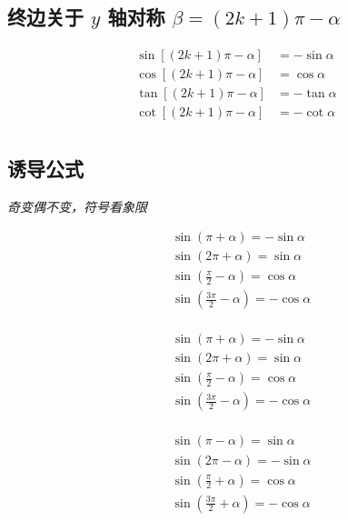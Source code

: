 \documentclass[a4paper, fleqn, fontset = mac]{ctexart}
\newcommand{\diform}{\noindent}
\begin{document}
\begin{multicols}{2}
		\subsection{终边关于 $ y $ 轴对称 $\beta=(2k+1)\pi-\alpha$}\diform
			\begin{align*}
			\sin\left[\left(2k+1\right)\pi-\alpha\right]&=-\sin\alpha \\
			\cos\left[\left(2k+1\right)\pi-\alpha\right]&=\cos\alpha \\
			\tan\left[\left(2k+1\right)\pi-\alpha\right]&=-\tan\alpha \\
			\cot\left[\left(2k+1\right)\pi-\alpha\right]&=-\cot\alpha \\
			\end{align*}
		\end{multicols}
		
		\subsection{诱导公式}
		\emph{奇变偶不变，符号看象限}
		
%			

		\begin{minipage}{0.3\textwidth}
			\begin{align*}
			& \sin\left( \pi + \alpha \right) = -\sin\alpha \\
			& \sin\left( 2\pi + \alpha \right) = \sin\alpha \\
			& \sin\left( \frac\pi2 - \alpha \right) = \cos\alpha \\
			& \sin\left( \frac{3\pi}2 - \alpha \right) = -\cos\alpha \\
			\end{align*}
		\end{minipage}
		\begin{minipage}{0.3\textwidth}
			\begin{align*}
			& \sin\left( \pi + \alpha \right) = -\sin\alpha \\
			& \sin\left( 2\pi + \alpha \right) = \sin\alpha \\
			& \sin\left( \frac\pi2 - \alpha \right) = \cos\alpha \\
			& \sin\left( \frac{3\pi}2 - \alpha \right) = -\cos\alpha \\
			\end{align*}
		\end{minipage}
		\begin{minipage}{0.3\textwidth}
			\begin{align*}
			& \sin\left( \pi - \alpha \right) = \sin\alpha \\
			& \sin\left( 2\pi - \alpha \right) = -\sin\alpha \\
			& \sin\left( \frac\pi2 + \alpha \right) = \cos\alpha \\
			& \sin\left( \frac{3\pi}2 + \alpha \right) = -\cos\alpha \\
			\end{align*}
		\end{minipage}
\end{document}
